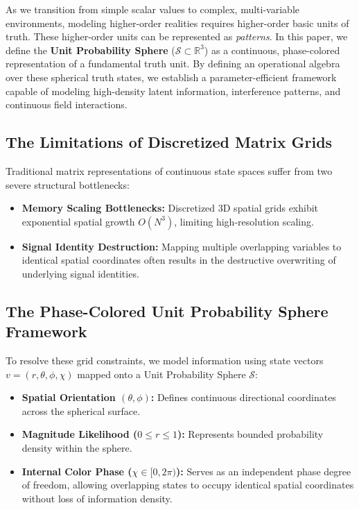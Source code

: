 \documentclass[12pt, a4paper]{article}
\begin{document}
As we transition from simple scalar values to complex, multi-variable environments, modeling higher-order realities requires higher-order basic units of truth. These higher-order units can be represented as \textit{patterns}. In this paper, we define the \textbf{Unit Probability Sphere} ($\mathcal{S} \subset \mathbb{R}^3$) as a continuous, phase-colored representation of a fundamental truth unit. By defining an operational algebra over these spherical truth states, we establish a parameter-efficient framework capable of modeling high-density latent information, interference patterns, and continuous field interactions.

\subsection{The Limitations of Discretized Matrix Grids}
Traditional matrix representations of continuous state spaces suffer from two severe structural bottlenecks:
\begin{itemize}
    \item \textbf{Memory Scaling Bottlenecks:} Discretized 3D spatial grids exhibit exponential spatial growth $O(N^3)$, limiting high-resolution scaling.
    \item \textbf{Signal Identity Destruction:} Mapping multiple overlapping variables to identical spatial coordinates often results in the destructive overwriting of underlying signal identities.
\end{itemize}

\subsection{The Phase-Colored Unit Probability Sphere Framework}
To resolve these grid constraints, we model information using state vectors $v = (r, \theta, \phi, \chi)$ mapped onto a Unit Probability Sphere $\mathcal{S}$:
\begin{itemize}
    \item \textbf{Spatial Orientation $(\theta, \phi)$:} Defines continuous directional coordinates across the spherical surface.
    \item \textbf{Magnitude Likelihood ($0 \leq r \leq 1$):} Represents bounded probability density within the sphere.
    \item \textbf{Internal Color Phase ($\chi \in [0, 2\pi)$):} Serves as an independent phase degree of freedom, allowing overlapping states to occupy identical spatial coordinates without loss of information density.
\end{itemize}
\end{document}
